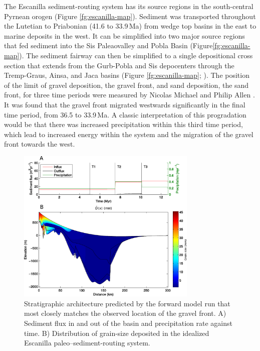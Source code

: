 The Escanilla sediment-routing system has its source regions in the south-central Pyrnean orogen (Figure \ref{fg:escanilla-map}). Sediment was transported throughout the Lutetian to Priabonian (41.6 to 33.9\,Ma) from wedge top basins in the east to marine deposits in the west. It can be simplified into two major source regions that fed sediment into the Sis Paleaovalley and Pobla Basin (Figure\ref{fg:escanilla-map}). The sediment fairway can then be simplified to a single depositional cross section that extends from the Gurb-Pobla and Sis depocenters through the Tremp-Graus, Ainsa, and Jaca basins (Figure \ref{fg:escanilla-map}; \citep{michael-etal-2013}). The position of the limit of gravel deposition, the gravel front, and sand deposition, the sand front, for three time periods were measured by Nicolas Michael and Philip Allen \citep{michael-etal-2013}. It was found that the gravel front migrated westwards significantly in the final time period, from 36.5 to 33.9\,Ma. A classic interpretation of this progradation would be that there was increased precipitation within this third time period, which lead to increased energy within the system and the migration of the gravel front towards the west.

\begin{figure}
\centering
\includegraphics[width=8.6cm]{./figures/ch2-escanilla-model.pdf}
\caption{Stratigraphic architecture predicted by the forward model run that most closely matches the observed location of the gravel front. A) Sediment flux in and out of the basin and precipitation rate against time. B) Distribution of grain-size deposited in the idealized Escanilla paleo--sediment-routing system.}
\label{fg:escanilla-model}
\end{figure}

